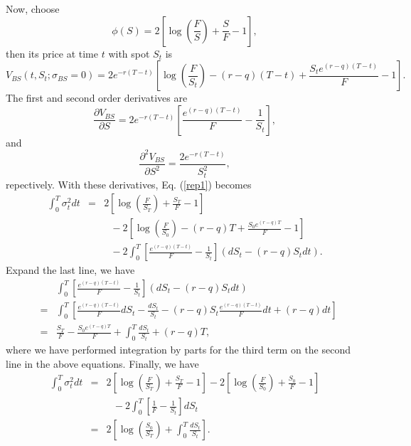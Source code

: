 \documentclass[12pt]{article}
\begin{document}
    Now, choose
    \begin{equation}
      \phi(S) = 2\left[\log\left(\frac{F}{S}\right)+\frac{S}{F}-1\right],
    \end{equation}
    then its price at time $t$ with spot $S_t$ is
    \begin{equation}
      V_{BS}(t,S_t;\sigma_{BS} = 0) = 2e^{-r(T-t)}\left[\log\left(\frac{F}{S_t}\right)-(r-q)(T-t)+\frac{S_te^{(r-q)(T-t)}}{F}-1\right].
    \end{equation}
    The first and second order derivatives are
    \begin{equation}
      \frac{\partial V_{BS}}{\partial S}=2e^{-r(T-t)}\left[\frac{e^{(r-q)(T-t)}}{F}-\frac{1}{S_t}\right],
    \end{equation}
    and
    \begin{equation}
      \frac{\partial^2 V_{BS}}{\partial S^2}=\frac{2e^{-r(T-t)}}{S_t^2},
    \end{equation}
    repectively. With these derivatives, Eq. (\ref{rep1}) becomes
    \begin{eqnarray}
      \int_0^T\sigma_t^2dt &=& 2\left[\log\left(\frac{F}{S_T}\right)+\frac{S_T}{F}-1\right]\nonumber\\
                            && \ \ \ - 2\left[\log\left(\frac{F}{S_0}\right)-(r-q)T+\frac{S_0e^{(r-q)T}}{F}-1\right]\nonumber\\
                            && \ \ \ - 2\int_0^T\left[\frac{e^{(r-q)(T-t)}}{F}-\frac{1}{S_t}\right]\left(dS_t-(r-q)S_tdt\right).
    \end{eqnarray}
    Expand the last line, we have
    \begin{eqnarray}
      &&\int_0^T\left[\frac{e^{(r-q)(T-t)}}{F}-\frac{1}{S_t}\right]\left(dS_t-(r-q)S_tdt\right)\nonumber\\
      &=& \int_0^T\left[\frac{e^{(r-q)(T-t)}}{F}dS_t-\frac{dS_t}{S_t}-(r-q)S_t\frac{e^{(r-q)(T-t)}}{F}dt+(r-q)dt\right]\nonumber\\
      &=& \frac{S_T}{F} - \frac{S_0e^{(r-q)T}}{F} + \int_0^T\frac{dS_t}{S_t} + (r-q)T,
    \end{eqnarray}
    where we have performed integration by parts for the third term on the second line in the above equations.
    Finally, we have
    \begin{eqnarray}
      \int_0^T\sigma_t^2dt &=& 2\left[\log\left(\frac{F}{S_T}\right)+\frac{S_T}{F}-1\right]
                                     - 2\left[\log\left(\frac{F}{S_0}\right)+\frac{S_0}{F}-1\right]\nonumber\\
                            && \ \ \ - 2\int_0^T\left[\frac{1}{F}-\frac{1}{S_t}\right]dS_t\nonumber\\
                           &=& 2\left[\log\left(\frac{S_0}{S_T}\right)+\int_0^T\frac{dS_t}{S_t}\right].
    \end{eqnarray}
\end{document}
